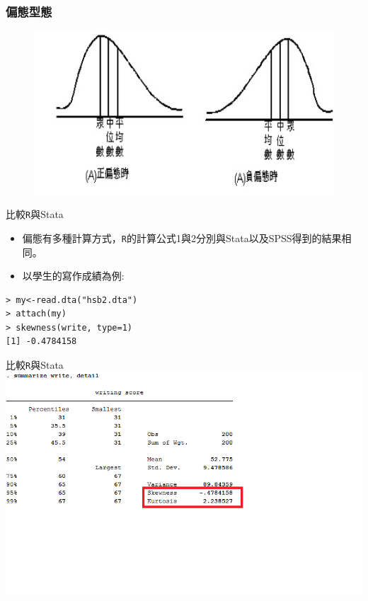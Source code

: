 \documentclass{beamer}
\begin{document}
\begin{frame}\frametitle{偏態型態}
\begin{figure}
\begin{center}
\includegraphics[scale=.6]{week3_skewness.jpg}
\end{center}
\end{figure}
\end{frame}
\begin{frame}[fragile]{比較\texttt{R}與Stata}
\begin{itemize}
\item 偏態有多種計算方式，\texttt{R}的計算公式1與2分別與Stata以及SPSS得到的結果相同。
\item 以學生的寫作成績為例:
\end{itemize}
\begin{Verbatim}[frame=single,label=\textit{R code}]
> my<-read.dta("hsb2.dta")
> attach(my)
> skewness(write, type=1)
[1] -0.4784158
\end{Verbatim}
\end{frame}
\begin{frame}{比較\texttt{R}與Stata}
\centering
\includegraphics[scale=.8]{write_stata.png}
\end{frame}
\end{document}
